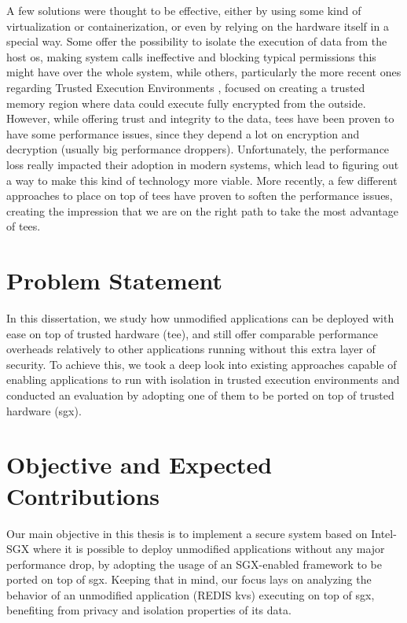 A few solutions were thought to be effective, either by using some kind of virtualization or containerization, or even by relying on the hardware itself in a special way. 
Some \cite{virtGhostPaper,flickerPaper,mushiPaper,SeCagePaper,inkTagPaper,segoPaper} offer the possibility to isolate the execution of data from the host \gls{os}, making system calls ineffective and blocking typical permissions this might have over the whole system, while others, particularly the more recent ones regarding Trusted Execution Environments \cite{armTZPaper,amdPaper,sanctumPaper,intelSGX}, focused on creating a trusted memory region where data could execute fully encrypted from the outside. 
However, while offering trust and integrity to the data, \gls{tee}s have been proven to have some performance issues, since they depend a lot on encryption and decryption (usually big performance droppers). Unfortunately, the performance loss really impacted their adoption in modern systems, which lead to figuring out a way to make this kind of technology more viable. 
More recently, a few different approaches to place on top of \gls{tee}s have proven to soften the performance issues, creating the impression that we are on the right path to take the most advantage of \gls{tee}s. 


\section{Problem Statement}

In this dissertation, we study how unmodified applications can be deployed with ease on top of trusted hardware (\gls{tee}), and still offer comparable performance overheads relatively to other applications running without this extra layer of security. To achieve this, we took a deep look into existing approaches capable of enabling applications to run with isolation in trusted execution environments and conducted an evaluation by adopting one of them to be ported on top of trusted hardware (\gls{sgx}). 


\section{Objective and Expected Contributions} %
\label{sec:objectiveAndContibutions}
Our main objective in this thesis is to implement a secure system based on Intel-SGX
where it is possible to deploy unmodified applications without any major performance
drop, by adopting the usage of an SGX-enabled framework to be ported on top of \gls{sgx}. Keeping that in mind, our focus lays on analyzing the behavior of an unmodified application (REDIS \gls{kvs}) executing on top of \gls{sgx}, benefiting from privacy and isolation properties of its data.

